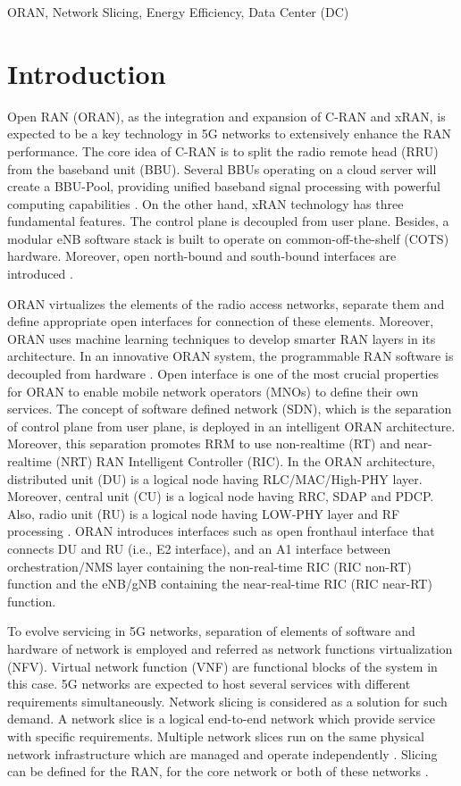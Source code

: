 \documentclass[conference]{IEEEtran}
\begin{document}
\begin{IEEEkeywords}
ORAN, Network Slicing, Energy Efficiency, Data Center (DC)
\end{IEEEkeywords}

\section{Introduction}
Open RAN (ORAN), as the integration and expansion of C-RAN and xRAN, is expected to be a key technology in 5G networks to extensively enhance the RAN performance. The core idea of C-RAN is to split the radio remote head (RRU) from the baseband unit (BBU). Several BBUs operating on a cloud server will create a BBU-Pool, providing unified baseband signal processing with powerful computing capabilities \cite{cran1,frdl,simeone2016cloud,motalleb2017optimal}. On the other hand, xRAN technology has three fundamental features. The control plane is decoupled from user plane. Besides, a modular eNB software stack is built to operate on common-off-the-shelf (COTS) hardware. Moreover, open north-bound and south-bound interfaces are introduced \cite{xran}.

ORAN virtualizes the elements of the radio access networks, separate them and define appropriate open interfaces for connection of these elements. Moreover, ORAN uses machine learning techniques to develop smarter RAN layers in its architecture. In an innovative ORAN system, the programmable RAN software is decoupled from hardware \cite{oran1}. Open interface is one of the most crucial properties for ORAN to enable mobile network operators (MNOs) to define their own services.
The concept of software defined network (SDN), which is the separation of control plane from user plane, is deployed in an intelligent ORAN architecture. Moreover, this separation promotes RRM to use non-realtime (RT) and near-realtime (NRT) RAN Intelligent Controller (RIC).
In the ORAN architecture, distributed unit (DU) is a logical node having RLC/MAC/High-PHY layer.
Moreover, central unit (CU) is a logical node having RRC, SDAP and PDCP. Also, radio unit (RU) is a logical node having LOW-PHY layer and
RF processing \cite{oranpaper}.
ORAN introduces interfaces such as open fronthaul interface that connects DU and RU (i.e., E2 interface), and an A1 interface between orchestration/NMS layer containing the non-real-time RIC (RIC non-RT) function and the eNB/gNB containing the near-real-time RIC (RIC near-RT) function.

To evolve servicing in 5G networks, separation of elements of software and hardware of network is employed and referred as network functions virtualization (NFV). Virtual network function (VNF) are functional blocks of the system in this case. 5G networks are expected to host several services with different requirements simultaneously. Network slicing is considered as a solution for such demand. A network slice is a logical end-to-end network which provide service with specific requirements. Multiple network slices run on the same physical network infrastructure which are managed and operate independently \cite{lee2018dynamic}. Slicing can be defined for the RAN, for the core network or both of these networks \cite{ns1}.
\end{document}
